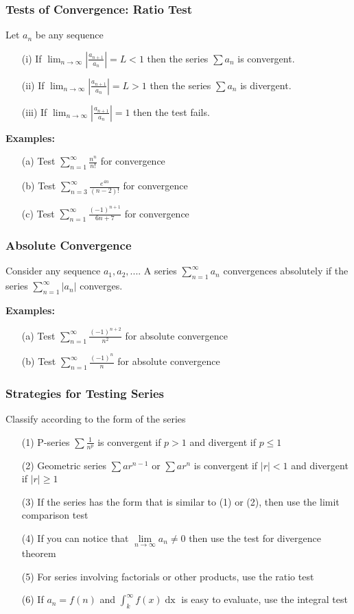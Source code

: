 \documentclass{beamer}
\begin{document}
\begin{frame}
\frametitle{Tests of Convergence: Ratio Test}
Let $a_n$ be any sequence
\begin{itemize}
	\item[(i)] If $\lim_{n\to \infty} |\frac{a_{n+1}}{a_n}| = L < 1$ then the series $\sum a_n$ is convergent.
	\item[(ii)] If $\lim_{n\to \infty} |\frac{a_{n+1}}{a_n}| = L > 1$ then the series $\sum a_n$ is divergent.
	\item[(iii)] If $\lim_{n\to \infty} |\frac{a_{n+1}}{a_n}| =  1$ then the test fails.
\end{itemize}

\vspace{12pt}
\textbf{Examples:}
\begin{itemize}
	\item[(a)] Test $\sum_{n=1}^\infty \frac{n^n}{n!}$ for convergence
	\item[(b)] Test $\sum_{n=3}^\infty \frac{e^{4n}}{(n-2)!}$ for convergence
	\item[(c)] Test $\sum_{n=1}^\infty \frac{(-1)^{n+1}}{6n+7}$ for convergence
\end{itemize}
\end{frame}

\begin{frame}
\frametitle{Absolute Convergence}
Consider any sequence $a_1, a_2,...$. A series $\sum_{n=1}^\infty a_n$ convergences absolutely if the series $\sum_{n=1}^\infty |a_n|$ converges.

\vspace{12pt}
\textbf{Examples:}
\begin{itemize}
	\item[(a)] Test $\sum_{n=1}^\infty \frac{(-1)^{n+2}}{n^2}$ for absolute convergence
	\item[(b)]  Test $\sum_{n=1}^\infty \frac{(-1)^n}{n}$ for absolute convergence
\end{itemize}
\end{frame}


\begin{frame}
\frametitle{Strategies for Testing Series}
Classify according to the form of the series
\begin{itemize}
	\item[(1)] P-series $\sum \frac{1}{n^p}$ is convergent if $p>1$ and divergent if $p \leq 1$
	\item[(2)] Geometric series $\sum ar^{n-1}$ or $\sum ar^n$ is convergent if $|r| < 1$ and divergent if $|r| \geq 1$
	\item[(3)] If the series has the form that is similar to (1) or (2), then use the limit comparison test
	\item[(4)] If you can notice that $\lim\limits_{n \to \infty} a_n \neq 0$ then use the test for divergence theorem
	\item[(5)] For series involving factorials or other products, use the ratio test
	\item[(6)] If $a_n = f(n)$ and $\int_k^\infty f(x) \mathop{dx}$ is easy to evaluate, use the integral test
\end{itemize}
\end{frame}
\end{document}
